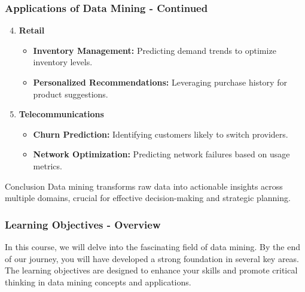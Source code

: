 \documentclass[aspectratio=169]{beamer}
\begin{document}
\begin{frame}[fragile]
    \frametitle{Applications of Data Mining - Continued}
    \begin{enumerate}
        \setcounter{enumi}{3}
        \item \textbf{Retail}
            \begin{itemize}
                \item \textbf{Inventory Management:} Predicting demand trends to optimize inventory levels.
                \item \textbf{Personalized Recommendations:} Leveraging purchase history for product suggestions.
            \end{itemize}
        \item \textbf{Telecommunications}
            \begin{itemize}
                \item \textbf{Churn Prediction:} Identifying customers likely to switch providers.
                \item \textbf{Network Optimization:} Predicting network failures based on usage metrics.
            \end{itemize}
    \end{enumerate}
    \begin{block}{Conclusion}
        Data mining transforms raw data into actionable insights across multiple domains, crucial for effective decision-making and strategic planning.
    \end{block}
\end{frame}

\begin{frame}[fragile]
    \frametitle{Learning Objectives - Overview}
    In this course, we will delve into the fascinating field of data mining. By the end of our journey, you will have developed a strong foundation in several key areas. The learning objectives are designed to enhance your skills and promote critical thinking in data mining concepts and applications.
\end{frame}
\end{document}
